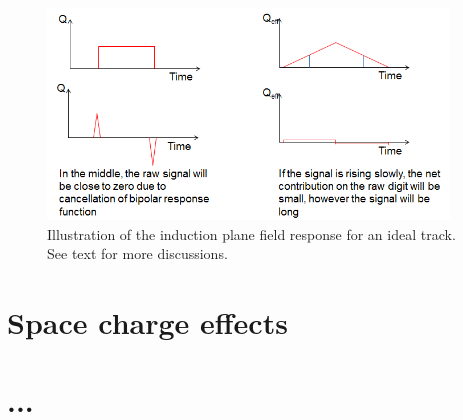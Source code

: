 \begin{figure}[!h!tbp]
\includegraphics[width=0.95\textwidth]{figures/ideal_track_2.png}
\caption{Illustration of the induction plane field response for an ideal track. See text for more 
discussions.}
\label{fig:ideal_track_2}
\end{figure}



\section{Space charge effects}

\section{...}
